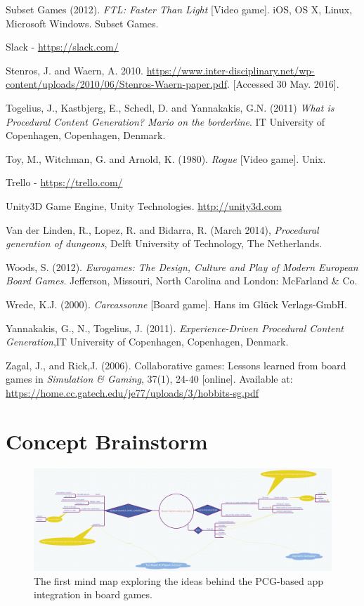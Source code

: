 \documentclass[a4paper,11pt]{report}
\begin{document}
\begin{thebibliography}{1}
Subset Games (2012). \textit{FTL: Faster Than Light} [Video game]. iOS, OS X, Linux, Microsoft Windows. Subset Games.

Slack - \url{https://slack.com/}

Stenros, J. and Waern, A. 2010. \url{https://www.inter-disciplinary.net/wp-content/uploads/2010/06/Stenros-Waern-paper.pdf}. [Accessed 30 May. 2016].

Togelius, J., Kastbjerg, E., Schedl, D. and Yannakakis, G.N. (2011) \emph{What is Procedural Content Generation? Mario on the borderline}. IT University of Copenhagen, Copenhagen, Denmark.

Toy, M., Witchman, G. and Arnold, K. (1980). \textit{Rogue} [Video game]. Unix.

Trello - \url{https://trello.com/}


Unity3D Game Engine, Unity Technologies.
\url{http://unity3d.com}

Van der Linden, R., Lopez, R. and Bidarra, R. (March 2014), \textit{Procedural generation of dungeons}, Delft University of Technology, The Netherlands.

Woods, S. (2012). \textit{Eurogames: The Design, Culture and Play of Modern European Board Games}. Jefferson, Missouri, North Carolina and London: McFarland \& Co.

Wrede, K.J. (2000). \textit{Carcassonne} [Board game]. Hans im Glück Verlags-GmbH.

Yannakakis, G., N., Togelius, J. (2011). \textit{Experience-Driven Procedural Content Generation},IT University of Copenhagen, Copenhagen, Denmark.

Zagal, J., and Rick,J. (2006). Collaborative games: Lessons learned from board games in \textit{Simulation \& Gaming}, 37(1), 24-40 [online]. Available at: \url{https://home.cc.gatech.edu/je77/uploads/3/hobbits-sg.pdf}


\end{thebibliography}
\pagebreak
\appendix
\chapter{Concept Brainstorm}
\begin{figure}[h]
    \centering
    \includegraphics[scale=0.18,angle=-90]{Images/Brainstorm1.png}
    \caption{The first mind map exploring the ideas behind the PCG-based app integration in board games.}
    \label{fig:brainstorm1}
\end{figure}
\end{document}
